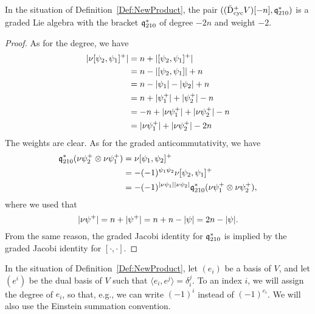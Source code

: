 \documentclass[\MainFolder/Text.tex]{subfiles}
\begin{document}
\begin{Proposition}\label{Prop:NewLieBr}
In the situation of Definition~\ref{Def:NewProduct}, the pair $((\bar{\mathrm{D}}^+_{\mathrm{cyc}} V)[-n],\mathfrak{q}_{210}^*)$ is a graded Lie algebra with the bracket $\mathfrak{q}^*_{210}$ of degree $-2n$ and weight $-2$.
\end{Proposition}
\begin{proof}
As for the degree, we have
\begin{align*}
|\mathbb{\nu} [\psi_2,\psi_1]^+| &= n+ |[\psi_2,\psi_1]^+| \\
&= n - |[\psi_2,\psi_1]|  + n \\
&= n  - |\psi_1|  - |\psi_2| + n\\
&= n + |\psi_1^+| + |\psi_2^+| - n \\
& = -n + |\mathbb{\nu} \psi_1^+| + |\mathbb{\nu} \psi_2^+| - n \\
& = |\mathbb{\nu} \psi_1^+| + |\mathbb{\nu} \psi_2^+| -2n
\end{align*}
The weights are clear. As for the graded anticommutativity, we have 
\begin{align*}
\mathfrak{q}_{210}^*(\mathbb{\nu} \psi_2^+ \otimes \mathbb{\nu}\psi_1^+) &= \mathbb{\nu}[\psi_1,\psi_2]^+ \\
&= -(-1)^{\psi_1 \psi_2} \mathbb{\nu}[\psi_2,\psi_1]^+ \\ 
&= -(-1)^{|\mathbb{\nu}\psi_1||\mathbb{\nu}\psi_2|} \mathfrak{q}_{210}^*(\mathbb{\nu} \psi_1^+ \otimes \mathbb{\nu}\psi_2^+),
\end{align*}
where we used that 
$$ |\mathbb{\nu} \psi^+| = n + |\psi^+| = n + n - |\psi| = 2n - |\psi|. $$ 
From the same reason, the graded Jacobi identity for $\mathfrak{q}_{210}^*$ is implied by the graded Jacobi identity for $[\cdot,\cdot]$.
\end{proof}

In the situation of Definition~\ref{Def:NewProduct}, let $(e_i)$ be a basis of $V$, and let $(e^i)$ be the dual basis of $V$ such that $\langle e_i, e^j \rangle= \delta_i^j$. To an index $i$, we will assign the degree of $e_i$, so that, e.g., we can write $(-1)^i$ instead of $(-1)^{e_i}$. We will also use the Einstein summation convention.
\end{document}
